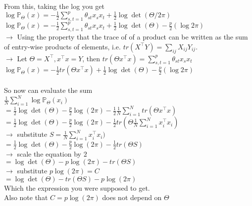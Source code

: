 \documentclass[11pt]{article}
\begin{document}
\begin{enumerate}[(a)]
From this, taking the log you get\\
$\log \mathbb{P}_{\Theta}(x) = - \frac{1}{2} \sum_{s,t=1}^p \theta_{st} x_s x_t + \frac{1}{2} \log \det (\Theta / 2\pi)$\\
$\log \mathbb{P}_{\Theta}(x) = - \frac{1}{2} \sum_{s,t=1}^p \theta_{st} x_s x_t + \frac{1}{2} \log \det (\Theta) -\frac{p}{2} (\log 2\pi)$\\
$\rightarrow$ Using the property that the trace of of a product can be written as the sum of entry-wise products of elements, i.e. $tr(X^\top Y) = \sum_{ij} X_{ij} Y_{ij}$.\\
$\rightarrow$ Let $\Theta = X^\top, x^\top x = Y$, then $tr(\Theta x^\top x) = \sum_{s,t=1}^p \theta_{st} x_s x_t$\\
$\log \mathbb{P}_{\Theta}(x) = - \frac{1}{2} tr(\Theta x^\top x) + \frac{1}{2} \log \det (\Theta) -\frac{p}{2} (\log 2\pi)$\\
\\
So now can evaluate the sum\\
$\frac{1}{N} \sum_{i=1}^N \log \mathbb{P}_\Theta (x_i)$\\
$= \frac{1}{2} \log \det (\Theta) - \frac{p}{2} \log(2\pi) - \frac{1}{2} \frac{1}{N} \sum_{i=1}^N tr(\Theta x^\top x)$\\
$= \frac{1}{2} \log \det (\Theta) - \frac{p}{2} \log(2\pi) - \frac{1}{2} tr(\Theta \frac{1}{N} \sum_{i=1}^N x_i^\top x_i)$\\
$\rightarrow$ substitute $S = \frac{1}{N} \sum_{i=1}^N x_i^\top x_i)$\\
$= \frac{1}{2} \log \det (\Theta) - \frac{p}{2} \log(2\pi) - \frac{1}{2} tr(\Theta S)$\\
$\rightarrow$ scale the equation by $2$\\
$= \log \det (\Theta) - p \log(2\pi) - tr(\Theta S)$\\
$\rightarrow$ substitute $p \log(2\pi) = C$\\
$= \log \det (\Theta) - tr(\Theta S) - p \log(2\pi)$\\
Which the expression you were supposed to get.\\
Also note that $C = p \log(2\pi)$ does not depend on $\Theta$


\end{enumerate}
\end{document}
